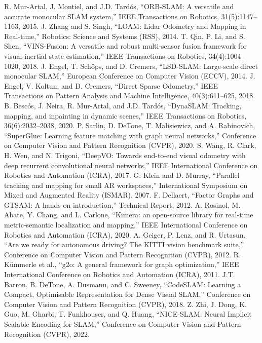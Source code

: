 \documentclass[conference]{IEEEtran}
\begin{document}
\begin{thebibliography}{00}
 R. Mur-Artal, J. Montiel, and J.D. Tardós, “ORB-SLAM: A versatile and accurate monocular SLAM system,” IEEE Transactions on Robotics, 31(5):1147–1163, 2015.
 J. Zhang and S. Singh, “LOAM: Lidar Odometry and Mapping in Real-time,” Robotics: Science and Systems (RSS), 2014.
 T. Qin, P. Li, and S. Shen, “VINS-Fusion: A versatile and robust multi-sensor fusion framework for visual-inertial state estimation,” IEEE Transactions on Robotics, 34(4):1004–1020, 2018.
 J. Engel, T. Schöps, and D. Cremers, “LSD-SLAM: Large-scale direct monocular SLAM,” European Conference on Computer Vision (ECCV), 2014.
 J. Engel, V. Koltun, and D. Cremers, “Direct Sparse Odometry,” IEEE Transactions on Pattern Analysis and Machine Intelligence, 40(3):611–625, 2018.
 B. Bescós, J. Neira, R. Mur-Artal, and J.D. Tardós, “DynaSLAM: Tracking, mapping, and inpainting in dynamic scenes,” IEEE Transactions on Robotics, 36(6):2032–2038, 2020.
 P. Sarlin, D. DeTone, T. Malisiewicz, and A. Rabinovich, “SuperGlue: Learning feature matching with graph neural networks,” Conference on Computer Vision and Pattern Recognition (CVPR), 2020.
 S. Wang, R. Clark, H. Wen, and N. Trigoni, “DeepVO: Towards end-to-end visual odometry with deep recurrent convolutional neural networks,” IEEE International Conference on Robotics and Automation (ICRA), 2017.
 G. Klein and D. Murray, “Parallel tracking and mapping for small AR workspaces,” International Symposium on Mixed and Augmented Reality (ISMAR), 2007.
 F. Dellaert, “Factor Graphs and GTSAM: A hands-on introduction,” Technical Report, 2012.
 A. Rosinol, M. Abate, Y. Chang, and L. Carlone, “Kimera: an open-source library for real-time metric-semantic localization and mapping,” IEEE International Conference on Robotics and Automation (ICRA), 2020.
 A. Geiger, P. Lenz, and R. Urtasun, “Are we ready for autonomous driving? The KITTI vision benchmark suite,” Conference on Computer Vision and Pattern Recognition (CVPR), 2012.
 R. Kümmerle et al., “g2o: A general framework for graph optimization,” IEEE International Conference on Robotics and Automation (ICRA), 2011.
 J.T. Barron, B. DeTone, A. Dusmanu, and C. Sweeney, “CodeSLAM: Learning a Compact, Optimisable Representation for Dense Visual SLAM,” Conference on Computer Vision and Pattern Recognition (CVPR), 2018.
 Z. Zhi, J. Dong, K. Guo, M. Gharbi, T. Funkhouser, and Q. Huang, “NICE-SLAM: Neural Implicit Scalable Encoding for SLAM,” Conference on Computer Vision and Pattern Recognition (CVPR), 2022.
\end{thebibliography}
\end{document}
